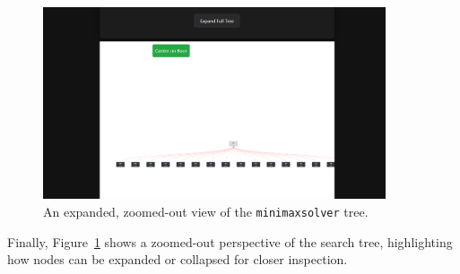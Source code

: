 \documentclass[12pt,a4paper]{article}
\begin{document}
\FloatBarrier
\begin{figure}[htbp]
  \centering
  \includegraphics[width=0.9\textwidth]{figures/treefinal.png}
  \caption{An expanded, zoomed-out view of the \texttt{minimaxsolver} tree.}
  \label{fig:minimaxtreefinal}
\end{figure}

\noindent
Finally, Figure~\ref{fig:minimaxtreefinal} shows a zoomed-out perspective of the 
search tree, highlighting how nodes can be expanded or collapsed for closer inspection.

\FloatBarrier

\noindent
\end{document}
